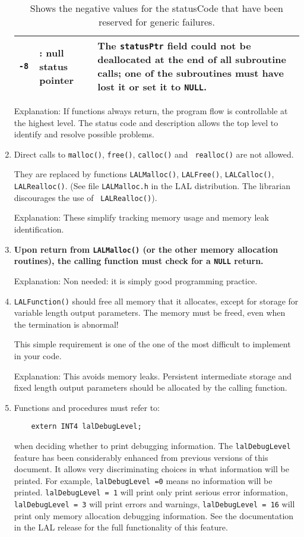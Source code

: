 \documentclass[]{ligodcc}
\renewcommand{\texttt}[1]{{\ttfamily\color{blue}#1}}
\begin{document}
\begin{enumerate}
\begin{table}
\begin{center}
\begin{tabular}{|cp{4.2cm}p{6.5cm}|}
\tt -8 & \vspace{-1.4ex}{\tt DETATCHSTATUSPTR}: null status pointer &
The {\tt statusPtr} field could not be deallocated at the end of all
subroutine calls; one of the subroutines must have lost it or set it
to {\tt NULL}. \\
\hline
\end{tabular}
\caption[Reserved negative status codes]{Shows the negative values for the {\texttt {statusCode}} that have been
reserved for generic failures.}
\label{statusCode}
\end{center}
\end{table}


Explanation: If functions always return, the program flow is
controllable at the highest level. The status code and description
allows the top level to identify and resolve possible problems.

\item
Direct calls to {\tt malloc()}, {\tt free()}, {\tt calloc()} and {\tt
realloc()} are not allowed.

They are replaced by functions {\tt LALMalloc()}, {\tt LALFree()},
{\tt LALCalloc()}, {\tt LALRealloc()}. (See file {\tt LALMalloc.h} in
the LAL distribution. The librarian discourages the use of {\tt
LALRealloc()}).

Explanation: These simplify tracking memory usage and memory leak
identification.

\item
{\bf Upon return from {\tt LALMalloc()} (or the other memory allocation
routines), the calling function must check for a {\tt NULL} return.}

Explanation: Non needed: it is simply good programming practice.

\item
{\tt LALFunction()} should free all memory that it allocates, except
for storage for variable length output parameters.
The memory must be freed, even when the termination is abnormal!

This simple requirement is one of the one of the most difficult to
implement in your code.

Explanation: This avoids memory leaks. Persistent intermediate storage
and fixed length output parameters should be allocated by the calling
function.

\item
Functions and procedures must refer to:
{\footnotesize
\begin{verbatim}
    extern INT4 lalDebugLevel;
\end{verbatim}}
when deciding whether to print debugging information. The
{\tt lalDebugLevel}  feature has been considerably enhanced from previous
versions of this document.  It allows very discriminating choices in
what information will be printed. For example, {\tt lalDebugLevel =0} means
no information will be printed. {\tt lalDebugLevel = 1} will print only
print serious error information, {\tt lalDebugLevel = 3} will print
errors and warnings, {\tt lalDebugLevel = 16} will print only memory
allocation debugging information. See the documentation in the LAL
release for the full functionality of this feature.


\end{enumerate}
\end{document}
